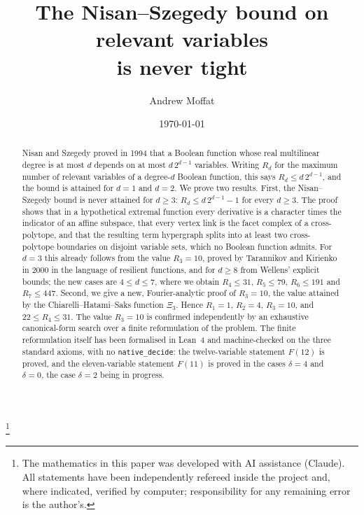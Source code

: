 \documentclass[11pt,reqno]{amsart}
\theoremstyle{plain}
\theoremstyle{definition}
\numberwithin{theorem}{section}
\newcommand{\XiC}{\Xi}
\newif\ifleandone
\newcommand{\leanstate}[2]{\ifleandone #1\else #2\fi}
\begin{document}
\title[The Nisan--Szegedy bound is never tight]
{The Nisan--Szegedy bound on relevant variables\\ is never tight}

\author{Andrew Moffat}
\thanks{The mathematics in this paper was developed with AI assistance (Claude).
All statements have been independently refereed inside the project and, where indicated,
verified by computer; responsibility for any remaining error is the author's.}

\date{\today}


\begin{abstract}
Nisan and Szegedy proved in 1994 that a Boolean function whose real multilinear degree is at
most $d$ depends on at most $d\,2^{d-1}$ variables. Writing $R_d$ for the maximum number of
relevant variables of a degree-$d$ Boolean function, this says $R_d \le d\,2^{d-1}$, and the
bound is attained for $d = 1$ and $d = 2$. We prove two results.
First, the Nisan--Szegedy bound is never attained for $d \ge 3$: $R_d \le d\,2^{d-1} - 1$ for
every $d \ge 3$. The proof shows that in a hypothetical extremal function every derivative is
a character times the indicator of an affine subspace, that every vertex link is the facet
complex of a cross-polytope, and that the resulting term hypergraph splits into at least two
cross-polytope boundaries on disjoint variable sets, which no Boolean function admits.
For $d = 3$ this already follows from the value $R_3 = 10$, proved by Tarannikov and Kirienko in
2000 in the language of resilient functions, and for $d \ge 8$ from Wellens' explicit bounds; the
new cases are $4 \le d \le 7$, where we obtain $R_4 \le 31$, $R_5 \le 79$, $R_6 \le 191$ and
$R_7 \le 447$. Second, we give a new, Fourier-analytic proof of $R_3 = 10$, the value attained by
the Chiarelli--Hatami--Saks function $\XiC_3$. Hence $R_1 = 1$, $R_2 = 4$, $R_3 = 10$, and
$22 \le R_4 \le 31$.
The value $R_3 = 10$ is confirmed independently by an exhaustive canonical-form search over
a finite reformulation of the problem. The finite reformulation itself has been formalised in
Lean~4 and machine-checked on the three standard axioms, with no \texttt{native\_decide}:
the twelve-variable statement $F(12)$ is proved,
\leanstate{and so is the eleven-variable statement $F(11)$.}{and the eleven-variable statement
$F(11)$ is proved in the cases $\delta = 4$ and $\delta = 0$, the case $\delta = 2$ being in
progress.}
\end{abstract}
\end{document}
